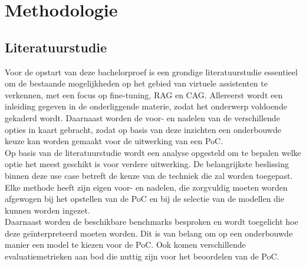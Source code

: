 
\chapter{Methodologie}
\label{ch:methodologie}


\section{Literatuurstudie}

Voor de opstart van deze bachelorproef is een grondige literatuurstudie essentieel om de bestaande mogelijkheden op het gebied van virtuele assistenten te verkennen, met een focus op fine-tuning, RAG en CAG. Allereerst wordt een inleiding gegeven in de onderliggende materie, zodat het onderwerp voldoende gekaderd wordt. Daarnaast worden de voor- en nadelen van de verschillende opties in kaart gebracht, zodat op basis van deze inzichten een onderbouwde keuze kan worden gemaakt voor de uitwerking van een PoC.
\\[1em]
Op basis van de literatuurstudie wordt een analyse opgesteld om te bepalen welke optie het meest geschikt is voor verdere uitwerking. De belangrijkste beslissing binnen deze use case betreft de keuze van de techniek die zal worden toegepast. Elke methode heeft zijn eigen voor- en nadelen, die zorgvuldig moeten worden afgewogen bij het opstellen van de PoC en bij de selectie van de modellen die kunnen worden ingezet.
\\[1em]
Daarnaast worden de beschikbare benchmarks besproken en wordt toegelicht hoe deze geïnterpreteerd moeten worden. Dit is van belang om op een onderbouwde manier een model te kiezen voor de PoC. Ook komen verschillende evaluatiemetrieken aan bod die nuttig zijn voor het beoordelen van de PoC.

